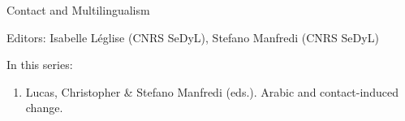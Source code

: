 {\large  Contact and Multilingualism}

\bigskip

Editors: Isabelle Léglise (CNRS SeDyL), Stefano Manfredi (CNRS SeDyL)  


\bigskip

In this series:

\begin{enumerate}
\item Lucas, Christopher \& Stefano Manfredi (eds.). Arabic and contact-induced change.
\end{enumerate}

\vfill

